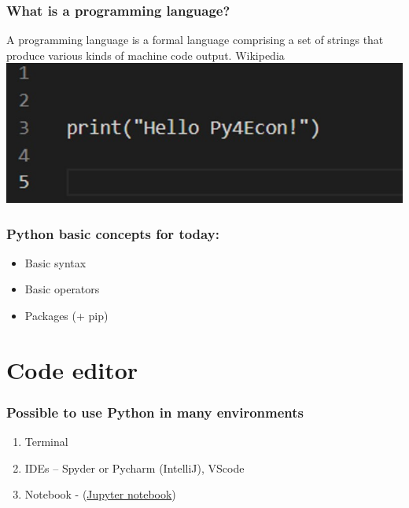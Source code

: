 \documentclass{beamer}
\begin{document}
\begin{frame}
    \frametitle{What is a programming language?}
    A programming language is a formal language comprising a set of strings 
    that produce various kinds of machine code output.
    Wikipedia \\
    \centering
    \includegraphics[scale = 0.3]{figures/hello.jpg}   
\end{frame}

\begin{frame}
    \frametitle{Python basic concepts for today:}

    \begin{itemize}
        \item Basic syntax
        \item Basic operators
        \item Packages (+ pip) %
    \end{itemize}
\end{frame}


\section{Code editor} 

\begin{frame}
    \frametitle{Possible to use Python in many environments}

    \begin{enumerate}
        \item Terminal
        \item IDEs – Spyder or Pycharm (IntelliJ), VScode
        \item Notebook -  (\href{https://github.com/susanli2016/Machine-Learning-with-Python}
        {Jupyter notebook})
    \end{enumerate}
\end{frame}
\end{document}
